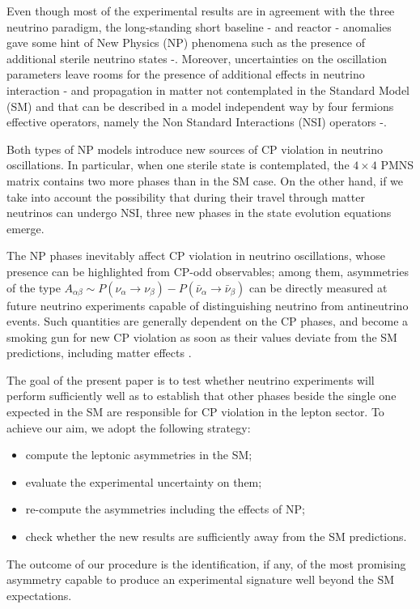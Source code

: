 \documentclass[12pt]{article}
\begin{document}
Even though most of the experimental results are in agreement with the three neutrino paradigm, the long-standing short baseline \cite{Athanassopoulos:1995iw}-\cite{Aguilar-Arevalo:2018gpe} and reactor \cite{Mention:2011rk}-\cite{Berryman:2020agd} anomalies gave some hint of New Physics (NP) phenomena such as the presence of additional sterile neutrino states \cite{Agarwalla:2016mrc}-\cite{Abe:2019fyx}. Moreover, uncertainties on the oscillation parameters leave rooms for the presence of additional effects in neutrino interaction \cite{Roulet:1991sm}-\cite{Guzzo:1991hi} and propagation in matter not contemplated in the Standard Model (SM) and that can be described in a model independent way by four fermions effective operators, namely the Non Standard Interactions (NSI) operators \cite{Farzan:2017xzy}-\cite{Verma:2018gwi}.

Both types of NP models introduce new sources of CP violation in neutrino oscillations. In particular, when one sterile state is contemplated, the $4\times 4$ PMNS matrix contains two more phases than in the SM case. On the other hand, if we take into account the possibility that during their travel through matter neutrinos can undergo NSI, three new phases in the state evolution equations emerge. 

The NP phases inevitably affect CP violation in neutrino oscillations, whose presence can be highlighted from CP-odd observables; among them, 
asymmetries of the type $A_{\alpha\beta} \sim P(\nu_\alpha\to \nu_\beta)-P(\bar{\nu}_\alpha \to \bar{\nu}_\beta)$ can be directly measured at future neutrino experiments capable of distinguishing neutrino from antineutrino events. Such quantities are generally dependent on the CP phases, and become a smoking gun for new CP violation as soon as their values deviate from the SM predictions, including matter effects \cite{Altarelli:2008yr}.

The goal of the present paper is to test whether neutrino experiments will perform sufficiently well as to establish that other phases beside the single one expected in the SM are responsible for CP violation in the lepton sector. To achieve our aim, we adopt the following strategy:
\begin{itemize}
\item compute the leptonic asymmetries in the SM;
\item evaluate the experimental uncertainty on them;
\item re-compute the asymmetries including the effects of NP;
\item check whether the new results are sufficiently away from the                                                        SM predictions.
\end{itemize}
The outcome of our procedure is the identification, if any, of the most promising asymmetry capable to produce an experimental signature well beyond the SM expectations. 
\end{document}
